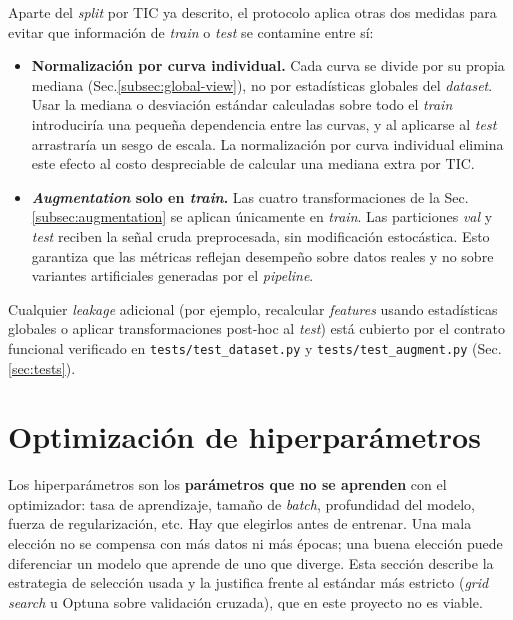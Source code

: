 \documentclass[11pt,a4paper]{article}
\begin{document}
Aparte del \textit{split} por TIC ya descrito, el protocolo aplica
otras dos medidas para evitar que información de \textit{train} o
\textit{test} se contamine entre sí:

\begin{itemize}
  \item \textbf{Normalización por curva individual.} Cada curva se
    divide por su propia mediana (Sec.\ref{subsec:global-view}), no
    por estadísticas globales del \textit{dataset}. Usar la mediana
    o desviación estándar calculadas sobre todo el \textit{train}
    introduciría una pequeña dependencia entre las curvas, y al
    aplicarse al \textit{test} arrastraría un sesgo de escala. La
    normalización por curva individual elimina este efecto al costo
    despreciable de calcular una mediana extra por TIC.
  \item \textbf{\textit{Augmentation} solo en \textit{train}.}
    Las cuatro transformaciones de la Sec.\ref{subsec:augmentation}
    se aplican únicamente en \textit{train}. Las particiones
    \textit{val} y \textit{test} reciben la señal cruda preprocesada,
    sin modificación estocástica. Esto garantiza que las métricas
    reflejan desempeño sobre datos reales y no sobre variantes
    artificiales generadas por el \textit{pipeline}.
\end{itemize}

Cualquier \textit{leakage} adicional (por ejemplo, recalcular
\textit{features} usando estadísticas globales o aplicar transformaciones
post-hoc al \textit{test}) está cubierto por el contrato funcional
verificado en \texttt{tests/test\_dataset.py} y
\texttt{tests/test\_augment.py} (Sec.\ref{sec:tests}).

\section{Optimización de hiperparámetros}
\label{sec:tuning}

Los hiperparámetros son los \textbf{parámetros que no se aprenden} con
el optimizador: tasa de aprendizaje, tamaño de \textit{batch},
profundidad del modelo, fuerza de regularización, etc. Hay que
elegirlos antes de entrenar. Una mala elección no se compensa con más
datos ni más épocas; una buena elección puede diferenciar un modelo
que aprende de uno que diverge. Esta sección describe la estrategia
de selección usada y la justifica frente al estándar más estricto
(\textit{grid search} u Optuna sobre validación cruzada), que en este
proyecto no es viable.
\end{document}
